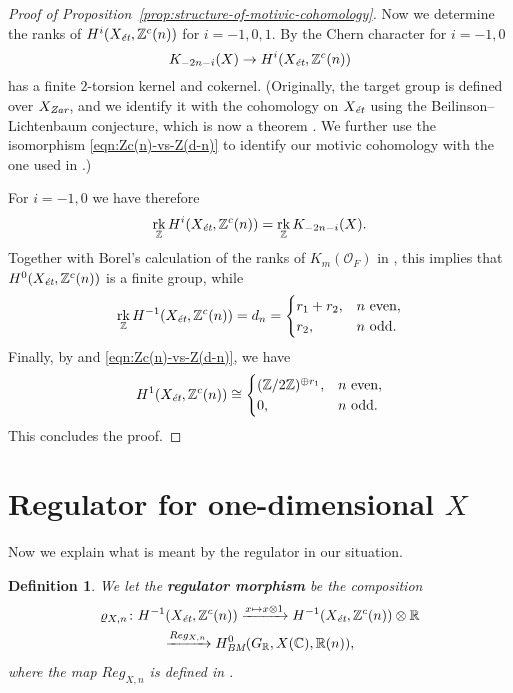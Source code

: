 \documentclass[draft]{article}
\DeclareMathOperator{\rk}{rk}
\newcommand{\CC}{\mathbb{C}}
\newcommand{\RR}{\mathbb{R}}
\newcommand{\ZZ}{\mathbb{Z}}
\newcommand{\BM}{\text{\it BM}}
\newcommand{\et}{\text{\it \'{e}t}}
\newcommand{\Zar}{\text{\it Zar}}
\theoremstyle{myplain}
\theoremstyle{mydefinition}
\newtheorem{definition}[theorem]{Definition}
\begin{document}
\begin{proof}[Proof of Proposition~\ref{prop:structure-of-motivic-cohomology}]
  Now we determine the ranks of $H^i (X_\et, \ZZ^c (n))$ for $i = -1,0,1$.
  By \cite[Proposition~2.1]{Kolster-Sands-2008} the Chern character for
  $i = -1,0$
  $$K_{-2n - i} (X) \to H^i (X_\et, \ZZ^c(n))$$
  has a finite $2$-torsion kernel and cokernel.
  (Originally, the target group is defined over $X_\Zar$, and we identify it
  with the cohomology on $X_\et$ using the Beilinson--Lichtenbaum conjecture,
  which is now a theorem \cite[Theorem~1.2]{Geisser-2004-Dedekind}. We further
  use the isomorphism \eqref{eqn:Zc(n)-vs-Z(d-n)} to identify our motivic
  cohomology with the one used in \cite{Kolster-Sands-2008}.)

  For $i = -1,0$ we have therefore
  $$\rk_\ZZ H^i (X_\et, \ZZ^c(n)) = \rk_\ZZ K_{-2n - i} (X).$$
  Together with Borel's calculation of the ranks of $K_m (\mathcal{O}_F)$ in \cite{Borel-1974}, this implies that
  $H^0 (X_\et, \ZZ^c (n))$ is a finite group, while
  \[ \rk_\ZZ H^{-1} (X_\et, \ZZ^c(n)) = d_n =
    \begin{cases}
      r_1 + r_2, & n \text{ even}, \\
      r_2, & n \text{ odd}.
    \end{cases} \]
  Finally, by \cite[p.\,179]{Kolster-Sands-2008} and
  \eqref{eqn:Zc(n)-vs-Z(d-n)}, we have
  \[ H^1 (X_\et, \ZZ^c(n)) \cong
    \begin{cases}
      (\ZZ/2\ZZ)^{\oplus r_1}, & n\text{ even}, \\
      0, & n\text{ odd}.
    \end{cases} \]
  This concludes the proof.
\end{proof}


\section{Regulator for one-dimensional $X$}
\label{sec:regulators}

Now we explain what is meant by the regulator in our situation.

\begin{definition}
  We let the \textbf{regulator morphism} be the composition
  \begin{multline*}
    \varrho_{X,n}\colon
    H^{-1} (X_\et, \ZZ^c (n)) \xrightarrow{x \mapsto x\otimes 1}
    H^{-1} (X_\et, \ZZ^c (n)) \otimes \RR \\
    \xrightarrow{Reg_{X,n}} H^0_\BM (G_\RR, X(\CC), \RR(n)),
  \end{multline*}
  where the map $Reg_{X,n}$ is defined in \cite[\S 2]{Beshenov-Weil-etale-2}.
\end{definition}
\end{document}
